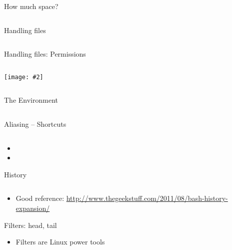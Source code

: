 \documentclass[hyperref={pdfpagelabels=false},12pt]{beamer}
\newcommand{\ig}[2]{\texttt{[image: \#2]}}
\newcommand{\myvbutton}[2]{\vfill\hyperlink{#1}{\beamerbutton{{#2}}}}
\begin{document}
\begin{frame}{How much space?}
\inputminted[bgcolor=lightgray,linenos,fontsize=\footnotesize]{bash}{code/navigate-the-filesystem-3.txt}
\end{frame}

\begin{frame}{Handling files}
\inputminted[bgcolor=lightgray,linenos,fontsize=\footnotesize]{bash}{code/handling-files-1.txt}
\end{frame}

\begin{frame}{Handling files: Permissions}
\inputminted[bgcolor=lightgray,linenos,fontsize=\footnotesize]{bash}{code/handling-files-2.txt}
\begin{center}
    \ig{0.75}{images/permissions.png}
\end{center}
\inputminted[bgcolor=lightgray,linenos,fontsize=\footnotesize]{bash}{code/handling-files-3.txt}
\end{frame}

\begin{frame}[label=environment]{The Environment}
\inputminted[bgcolor=lightgray,linenos,fontsize=\footnotesize]{bash}{code/the-environment-1.txt}
\myvbutton{exercises-1}{exercises}
\end{frame}

\begin{frame}{Aliasing -- Shortcuts}
\inputminted[bgcolor=lightgray,linenos,fontsize=\footnotesize]{bash}{code/the-environment-2.txt}
\begin{itemize}
    \item \color{red}{Don't use these for ssh!}
    \item \color{red}{Don't use these in scripts!}
\end{itemize}
\end{frame}

\begin{frame}{History}
\inputminted[bgcolor=lightgray,linenos,fontsize=\footnotesize]{bash}{code/the-environment-3.txt}
\begin{itemize}
    \item Good reference: \url{http://www.thegeekstuff.com/2011/08/bash-history-expansion/}
\end{itemize}
\end{frame}

\begin{frame}{Filters: head, tail}
\begin{itemize}
    \item Filters are Linux power tools
\end{itemize}
\inputminted[bgcolor=lightgray,linenos,fontsize=\footnotesize]{bash}{code/simple-filters-1.txt}
\end{frame}
\end{document}
